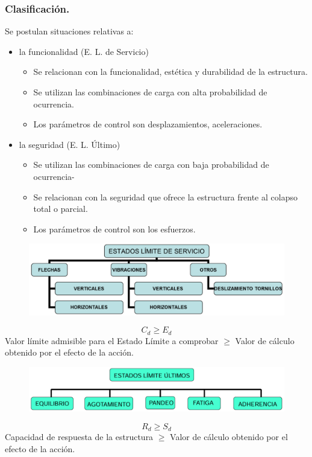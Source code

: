 \subsubsection{Clasificación.}
Se postulan situaciones relativas a:
\begin{itemize}
    \item la funcionalidad (E. L. de Servicio)
    \begin{itemize}
        \item Se relacionan con la funcionalidad, estética y durabilidad de la estructura.
        \item Se utilizan las combinaciones de carga con alta probabilidad de ocurrencia.
        \item Los parámetros de control son desplazamientos, aceleraciones.
    \end{itemize}
    \item la seguridad (E. L. Último)
    \begin{itemize}
        \item Se utilizan las combinaciones de carga con baja probabilidad de ocurrencia-
        \item Se relacionan con la seguridad que ofrece la estructura frente al colapso total o parcial.
        \item Los parámetros de control son los esfuerzos.
    \end{itemize}
\end{itemize}

\begin{figure}[h]
    \centering
    \includegraphics[width=\linewidth]{Imagenes/Estados limite de servicio.png}
\end{figure}

\begin{equation}
    C_d \geq E_d
\end{equation}
Valor límite admisible para el Estado Límite a comprobar $\geq$ Valor de cálculo obtenido por el efecto de la acción.

\begin{figure}[h]
    \centering
    \includegraphics[width=\linewidth]{Imagenes/Estados limite ultimos.png}
\end{figure}

\begin{equation}
    R_d \geq S_d
\end{equation}
Capacidad de respuesta de la estructura $\geq$ Valor de cálculo obtenido por el efecto de la acción.